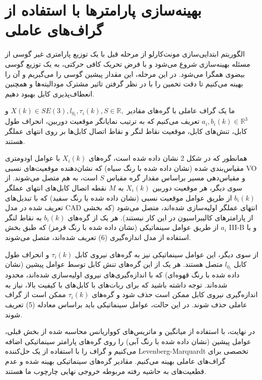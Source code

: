 \section{بهینه‌سازی پارامترها با استفاده از گراف‌های عاملی}

الگوریتم ابتدایی‌سازی مونت‌کارلو از مرحله قبل با یک توزیع پارامتری غیر گوسی از مسئله بهینه‌سازی شروع می‌شود و با فرض تحریک کافی حرکتی، به یک توزیع گوسی بیضوی همگرا می‌شود. در این مرحله، این مقدار پیشین گوسی را می‌گیریم و آن را بهینه می‌کنیم تا دقت تخمین را با در نظر گرفتن تاثیر مشترک مودالیته‌ها و همچنین انعطاف‌پذیری کابل بهبود دهیم.

ما یک گراف عاملی با گره‌های مقادیر \( X(k) \in SE(3), l_{0_i}, \tau_i(k), S \in \mathbb{R}, \) و \( a_i, b_i(k) \in \mathbb{R}^3 \) تعریف می‌کنیم که به ترتیب نمایانگر موقعیت دوربین، انحراف طول کابل، تنش‌های کابل، موقعیت نقاط لنگر و نقاط اتصال کابل‌ها بر روی انتهای عملگر هستند.

همانطور که در شکل 2 نشان داده شده است، گره‌های \( X_i(k) \) با عوامل اودومتری مقیاس‌بندی شده (نشان داده شده با رنگ سیاه) که نشان‌دهنده موقعیت‌های نسبی VO و مقیاس‌دهی مسیر براساس مقدار گره مقیاس \( S \) است، به هم متصل می‌شوند. از سوی دیگر، هر موقعیت دوربین \( X_i(k) \) به \( M \) نقطه اتصال کابل‌های انتهای عملگر \( b_i(k) \) از طریق عوامل موقعیت نسبی (نشان داده شده با رنگ سفید) که با تبدیل‌های تعریف شده در مدل CAD انتهای عملگر اولیه‌سازی شده‌اند، متصل می‌شود (که بخشی از پارامترهای کالیبراسیون در این کار نیستند). هر یک از گره‌های \( b_i(k) \) به نقاط لنگر \( a_i \) از طریق عوامل سینماتیکی (نشان داده شده با رنگ قرمز) که طبق بخش III-B و با استفاده از مدل اندازه‌گیری (6) تعریف شده‌اند، متصل می‌شوند.

از سوی دیگر، این عوامل سینماتیکی نیز به گره‌های نیروی کابل \( \tau_i(k) \) و انحراف طول کابل \( l_{0_i} \) متصل هستند. هر یک از این گره‌های تنش کابل توسط عوامل پیشین (نشان داده شده با رنگ قهوه‌ای) که با اندازه‌گیری‌های نیروی اولیه‌سازی شده‌اند، محدود شده‌اند. توجه داشته باشید که برای ربات‌های با کابل‌های با کیفیت بالا، نیاز به اندازه‌گیری نیروی کابل ممکن است حذف شود و گره‌های \( \tau_i(k) \) ممکن است از گراف عاملی حذف شوند. در این حالت، عوامل سینماتیکی باید براساس معادله (5) تعریف شوند.

در نهایت، با استفاده از میانگین و ماتریس‌های کوواریانس محاسبه شده از بخش قبلی، عوامل پیشین (نشان داده شده با رنگ آبی) را روی گره‌های پارامتر سینماتیکی اضافه می‌کنیم و گراف را با استفاده از یک حل‌کننده Levenberg-Marquardt تخصصی برای گراف‌های عاملی بهینه می‌کنیم. مقادیر گره‌های سینماتیکی بهینه شده و عدم قطعیت‌های به حاشیه رفته مربوطه خروجی نهایی چارچوب ما هستند.

